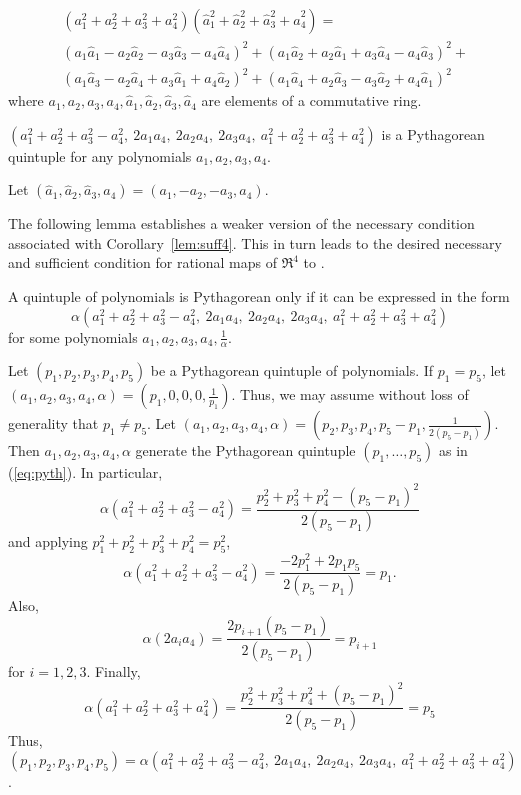\documentclass[11pt]{article}
\begin{document}
\begin{lemma}
\label{lem:euler}
\[
\begin{array}{ll}
& (a_1^2 + a_2^2 + a_3^2 + a_4^2) 
(\hat{a}^2_1 + \hat{a}^2_2 + \hat{a}^2_3 + \hat{a}^2_4) = \\
& (a_1 \hat{a}_1 - a_2\hat{a}_2 - a_3\hat{a}_3 - a_4\hat{a}_4)^2 +
   (a_1\hat{a}_2 + a_2\hat{a}_1 + a_3\hat{a}_4 - a_4\hat{a}_3)^2 + \\
& (a_1\hat{a}_3 - a_2\hat{a}_4 + a_3\hat{a}_1 + a_4\hat{a}_2)^2 +
   (a_1\hat{a}_4 + a_2\hat{a}_3 - a_3\hat{a}_2 + a_4\hat{a}_1)^2
\end{array}
\]
where $a_1,a_2,a_3,a_4,\hat{a}_1,\hat{a}_2,\hat{a}_3,\hat{a}_4$ are elements of a
commutative ring.
\end{lemma}

\begin{corollary}
\label{lem:suff4}
$(a_1^2 + a_2^2 + a_3^2 - a_4^2,\ 2a_1a_4,\ 2a_2a_4,\ 2a_3a_4,\ 
 a_1^2 + a_2^2 + a_3^2 + a_4^2)$
is a Pythagorean quintuple for any polynomials $a_1,a_2,a_3,a_4$.
\end{corollary}
\prf
Let $(\hat{a}_1,\hat{a}_2,\hat{a}_3,\hat{a}_4) = (a_1,-a_2,-a_3,a_4)$. 
\QED

\noindent The following lemma establishes a weaker version of the necessary condition
associated with Corollary~\ref{lem:suff4}.
This in turn leads to the desired necessary and sufficient condition for rational maps
of $\Re^4$ to \Sn{3}.

\begin{lemma}
\label{thm:necessary4}
A quintuple of polynomials is Pythagorean only if it can be expressed in the form
\begin{equation}
\label{eq:pyth}
	\alpha (a_1^2 + a_2^2 + a_3^2 - a_4^2,
		\ 2a_1a_4,\ 2a_2a_4,\ 2a_3a_4,
		\ a_1^2 + a_2^2 + a_3^2 + a_4^2)
\end{equation}
for some polynomials $a_1,a_2,a_3,a_4,\frac{1}{\alpha}$.
\end{lemma}
\prf
Let $(p_1,p_2,p_3,p_4,p_5)$ be a Pythagorean quintuple of polynomials.
If $p_1 = p_5$, let\\
$(a_1,a_2,a_3,a_4,\alpha) = (p_1,0,0,0,\frac{1}{p_1})$.
Thus, we may assume without loss of generality that $p_1 \neq p_5$.
Let $(a_1,a_2,a_3,a_4,\alpha) = (p_2,p_3,p_4,p_5-p_1,\frac{1}{2(p_5 - p_1)})$.
Then $a_1,a_2,a_3,a_4,\alpha$ generate the Pythagorean quintuple
$(p_1,\ldots,p_5)$ as in (\ref{eq:pyth}).
In particular,
\[
\alpha (a_1^2 + a_2^2 + a_3^2 - a_4^2)
= \frac{p_2^2 + p_3^2 + p_4^2 - (p_5 - p_1)^2}{2(p_5-p_1)}
\]
and applying $p_1^2 + p_2^2 + p_3^2 + p_4^2 = p_5^2$,
\[
\alpha (a_1^2 + a_2^2 + a_3^2 - a_4^2) = \frac{-2p_1^2 + 2p_1p_5}{2(p_5 - p_1)} = p_1.
\]
Also, 
\[
\alpha (2a_i a_4) = \frac{2p_{i+1}(p_5 - p_1)}{2(p_5 - p_1)} = p_{i+1}
\]
for $i=1,2,3$.
Finally, 
\[
\alpha(a_1^2 + a_2^2 + a_3^2 + a_4^2) 
= \frac{p_2^2 + p_3^2 + p_4^2 + (p_5 - p_1)^2}{2(p_5-p_1)} = p_5
\]
Thus, $(p_1,p_2,p_3,p_4,p_5) = \alpha (a_1^2 + a_2^2 + a_3^2 - a_4^2,
		\ 2a_1a_4,\ 2a_2a_4,\ 2a_3a_4,
		\ a_1^2 + a_2^2 + a_3^2 + a_4^2)$.
\QED
\end{document}
